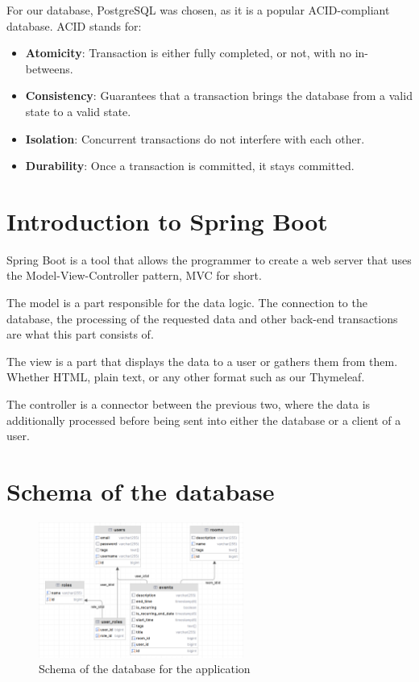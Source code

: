 For our database, PostgreSQL was chosen, as it is a popular ACID-compliant database.
ACID stands for:
\begin{itemize}
    \item \textbf{Atomicity}: Transaction is either fully completed, or not, with no in-betweens.
    \item \textbf{Consistency}: Guarantees that a transaction brings the database from a valid state to a valid state.
    \item \textbf{Isolation}: Concurrent transactions do not interfere with each other.
    \item \textbf{Durability}: Once a transaction is committed, it stays committed.
\end{itemize}

\section{Introduction to Spring Boot}\label{sec:introduction-to-spring-boot}

Spring Boot is a tool that allows the programmer to create a web server that uses the Model-View-Controller pattern, MVC for short.

The model is a part responsible for the data logic.
The connection to the database, the processing of the requested data and other back-end transactions are what this part consists of.

The view is a part that displays the data to a user or gathers them from them.
Whether HTML, plain text, or any other format such as our Thymeleaf.

The controller is a connector between the previous two, where the data is additionally processed before being sent into either the database or a client of a user.


\section{Schema of the database}\label{sec:schema-of-the-database}
\begin{figure}[h]
  \centering
  \includegraphics[width=0.6\textwidth]{schemaDB}
  \caption{Schema of the database for the application}
  \label{fig:schemaDB}
\end{figure}

